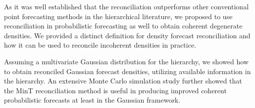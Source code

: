 \documentclass[a4paper, 11pt]{article}
\begin{document}
As it was well established that the reconciliation outperforms other conventional point forecasting methods in the hierarchical literature, we proposed to use reconciliation in probabilistic forecasting as well to obtain coherent degenerate densities. We provided a distinct definition for density forecast reconciliation and how it can be used to reconcile incoherent densities in practice.

Assuming a multivariate Gaussian distribution for the hierarchy, we showed how to obtain reconciled Gaussian forecast densities, utilizing available information in the hierarchy. An extensive Monte Carlo simulation study further showed that the MinT reconciliation method \citep{Wickramasuriya2017} is useful in producing improved coherent probabilistic forecasts at least in the Gaussian framework.


\newpage
\printbibliography
\end{document}
